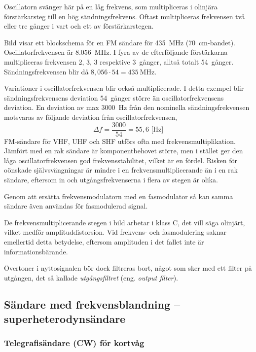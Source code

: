 Oscillatorn svänger här på en låg frekvens, som multipliceras i
olinjära förstärkarsteg till en hög sändningsfrekvens.
Oftast multipliceras frekvensen två eller tre gånger i vart och ett av
förstärkarstegen.

Bild  visar ett blockschema för en FM sändare för
\qty{435}{\mega\hertz} (\qty{70}{\centi\metre}-bandet).
Oscillatorfrekvensen är \qty{8,056}{\mega\hertz}.
I fyra av de efterföljande förstärkarna multipliceras frekvensen 2, 3, 3
respektive 3~gånger, alltså totalt 54~gånger.
Sändningsfrekvensen blir då \(8,056 \cdot 54 = \qty{435}{\mega\hertz}\).

Variationer i oscillatorfrekvensen blir också multiplicerade.
I detta exempel blir sändningsfrekvensens deviation 54~gånger större än
oscillatorfrekvensens deviation.
En deviation av max \qty{3000}{\hertz} från den nominella sändningsfrekvensen
motsvaras av följande deviation från oscillatorfrekvensen,
\[\Delta f = \frac{3000}{54} = 55,6\text{ [Hz]}\]
FM-sändare för VHF, UHF och SHF utförs ofta med
frekvensmultiplikation.
Jämfört med en rak sändare är komponentbehovet större, men i stället ger
den låga oscillatorfrekvensen god frekvensstabilitet, vilket är en fördel.
Risken för oönskade självsvängningar är mindre i en frekvensmultiplicerande
än i en rak sändare, eftersom in och utgångsfrekvenserna i flera av stegen är
olika.

Genom att ersätta frekvensmodulatorn med en fasmodulator så kan samma
sändare även användas för fasmodulerad signal.

De frekvensmultiplicerande stegen i bild  arbetar i klass C,
det vill säga olinjärt, vilket medför amplituddistorsion.
Vid frekvens- och fasmodulering saknar emellertid detta betydelse, eftersom
amplituden i det fallet inte är informationsbärande.

Övertoner i nyttosignalen bör dock filtreras bort, något som sker med ett
filter på utgången, det så kallade \emph{utgångsfiltret}
(eng. \emph{output filter}).


\newpage
\subsection{Sändare med frekvensblandning -- superheterodynsändare}
\label{sändare_frekvensblandning}

\subsubsection{Telegrafisändare (CW) för kortvåg}

